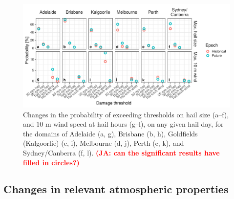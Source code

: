 \documentclass[]{agujournal2019}\usepackage[]{graphicx}\usepackage[]{xcolor}
\newcommand*{\todo}[1]{\textbf{\textcolor{red}{(#1)}}}
\begin{document}
\begin{figure}[!ht]
      \includegraphics[width=\textwidth]{figures/threshold_probs}
      \caption{Changes in the probability of exceeding thresholds on hail size
      (a--f), and 10 m wind speed at hail hours (g--l), on any given hail day,
      for the domains of Adelaide (a, g), Brisbane (b, h), Goldfields
      (Kalgoorlie) (c, i), Melbourne (d, j), Perth (e, k), and Sydney/Canberra
      (f, l). \todo{JA: can the significant results have filled in circles?}}
      \label{fig:thresholds}
\end{figure}

\subsection{Changes in relevant atmospheric properties}
\end{document}

